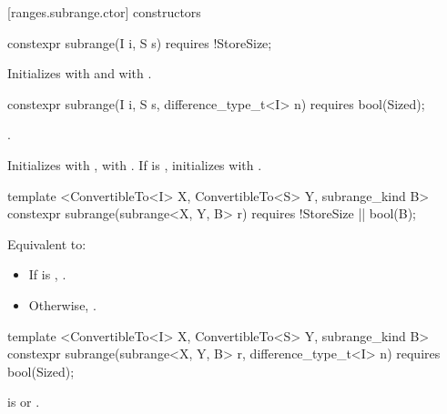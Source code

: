 \begin{addedblock}
[ranges.subrange.ctor]{ constructors}

%
\begin{itemdecl}
constexpr subrange(I i, S s) requires !StoreSize;
\end{itemdecl}

\begin{itemdescr}
\pnum
\effects Initializes  with  and  with
.
\end{itemdescr}

%
\begin{itemdecl}
constexpr subrange(I i, S s, difference_type_t<I> n) requires bool(Sized);
\end{itemdecl}

\begin{itemdescr}
\pnum
\requires {}.

\pnum
\effects Initializes  with ,  with
. If  is , initializes  with
.
\end{itemdescr}

%
\begin{itemdecl}
template <ConvertibleTo<I> X, ConvertibleTo<S> Y, subrange_kind B>
constexpr subrange(subrange<X, Y, B> r) requires !StoreSize || bool(B);
\end{itemdecl}

\begin{itemdescr}
\pnum
\effects Equivalent to:
\begin{itemize}
\item If  is ,
.
\item Otherwise, .
\end{itemize}
\end{itemdescr}

%
\begin{itemdecl}
template <ConvertibleTo<I> X, ConvertibleTo<S> Y, subrange_kind B>
constexpr subrange(subrange<X, Y, B> r, difference_type_t<I> n) requires bool(Sized);
\end{itemdecl}

\begin{itemdescr}
\pnum
\requires {} is  or .


\end{itemdescr}
\end{addedblock}
